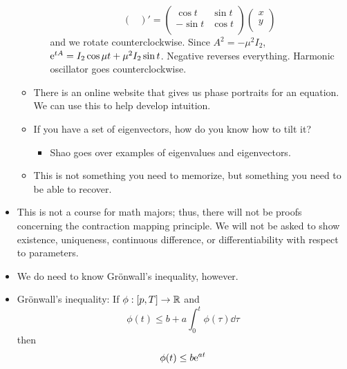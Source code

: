 \documentclass[../notes.tex]{subfiles}
\begin{document}
\begin{itemize}
\begin{itemize}
\begin{enumerate}
\begin{equation*}
\begin{pmatrix}
                \end{pmatrix}'
                =
                \begin{pmatrix}
                    \cos t & \sin t\\
                    -\sin t & \cos t\\
                \end{pmatrix}
                \begin{pmatrix}
                    x\\
                    y\\
                \end{pmatrix}
            \end{equation*}
            and we rotate counterclockwise.
            Since $A^2=-\mu^2 I_2$, $\e[tA]=I_2\cos\mu t+\mu^2I_2\sin t$.
            Negative reverses everything.
            Harmonic oscillator goes counterclockwise.
        \end{enumerate}
        \item There is an online website that gives us phase portraits for an equation. We can use this to help develop intuition.
        \item If you have a set of eigenvectors, how do you know how to tilt it?
        \begin{itemize}
            \item Shao goes over examples of eigenvalues and eigenvectors.
        \end{itemize}
        \item This is not something you need to memorize, but something you need to be able to recover.
    \end{itemize}
    \item This is not a course for math majors; thus, there will not be proofs concerning the contraction mapping principle. We will not be asked to show existence, uniqueness, continuous difference, or differentiability with respect to parameters.
    \item We do need to know Gr\"{o}nwall's inequality, however.
    \item Gr\"{o}nwall's inequality: If $\phi:[p,T]\to\R$ and
    \begin{equation*}
        \phi(t) \leq b+a\int_0^t\phi(\tau)\dd\tau
    \end{equation*}
    then
    \begin{equation*}
        \phi(t) \leq b\e[at]
    \end{equation*}
    \begin{itemize}

\end{itemize}
\end{itemize}
\end{document}
